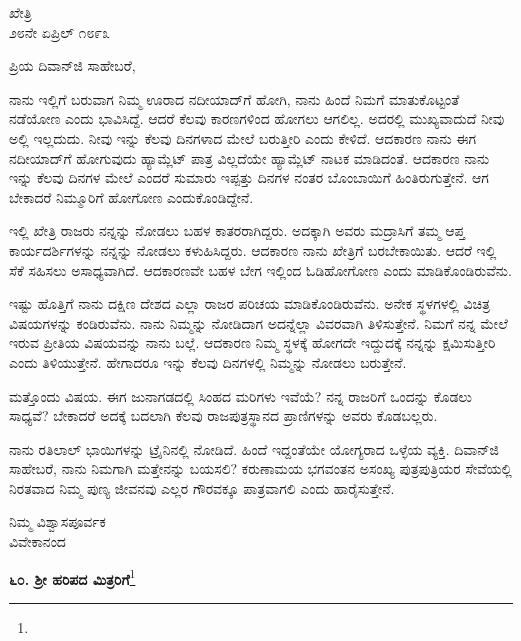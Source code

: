 \vspace{-0.45cm}

\begin{flushright}
ಖೇತ್ರಿ\\೨೮ನೇ ಏಪ್ರಿಲ್ ೧೮೯೩
\end{flushright}

\noindent
ಪ್ರಿಯ ದಿವಾನ್‌ಜಿ ಸಾಹೇಬರೆ,

ನಾನು ಇಲ್ಲಿಗೆ ಬರುವಾಗ ನಿಮ್ಮ ಊರಾದ ನದೀಯಾದ್‌ಗೆ ಹೋಗಿ, ನಾನು ಹಿಂದೆ ನಿಮಗೆ ಮಾತುಕೊಟ್ಟಂತೆ ನಡೆಯೋಣ ಎಂದು ಭಾವಿಸಿದ್ದೆ. ಆದರೆ ಕೆಲವು ಕಾರಣಗಳಿಂದ ಹೋಗಲು ಆಗಲಿಲ್ಲ. ಅದರಲ್ಲಿ ಮುಖ್ಯವಾದುದೆ ನೀವು ಅಲ್ಲಿ ಇಲ್ಲದುದು. ನೀವು ಇನ್ನು ಕೆಲವು ದಿನಗಳಾದ ಮೇಲೆ ಬರುತ್ತೀರಿ ಎಂದು ಕೇಳಿದೆ. ಆದಕಾರಣ ನಾನು ಈಗ ನದೀಯಾದ್‌ಗೆ ಹೋಗುವುದು ಹ್ಯಾಮ್ಲೆಟ್ ಪಾತ್ರ ವಿಲ್ಲದೆಯೇ ಹ್ಯಾಮ್ಲೆಟ್ ನಾಟಕ ಮಾಡಿದಂತೆ. ಆದಕಾರಣ ನಾನು ಇನ್ನು ಕೆಲವು ದಿನಗಳ ಮೇಲೆ ಎಂದರೆ ಸುಮಾರು ಇಪ್ಪತ್ತು ದಿನಗಳ ನಂತರ ಬೊಂಬಾಯಿಗೆ ಹಿಂತಿರುಗುತ್ತೇನೆ. ಆಗ ಬೇಕಾದರೆ ನಿಮ್ಮೂರಿಗೆ ಹೋಗೋಣ ಎಂದುಕೊಂಡಿದ್ದೇನೆ.

ಇಲ್ಲಿ ಖೇತ್ರಿ ರಾಜರು ನನ್ನನ್ನು ನೋಡಲು ಬಹಳ ಕಾತರರಾಗಿದ್ದರು. ಅದಕ್ಕಾಗಿ ಅವರು ಮದ್ರಾಸಿಗೆ ತಮ್ಮ ಆಪ್ತ ಕಾರ್ಯದರ್ಶಿಗಳನ್ನು ನನ್ನನ್ನು ನೋಡಲು ಕಳುಹಿಸಿದ್ದರು. ಆದಕಾರಣ ನಾನು ಖೇತ್ರಿಗೆ ಬರಬೇಕಾಯಿತು. ಆದರೆ ಇಲ್ಲಿ ಸೆಕೆ ಸಹಿಸಲು ಅಸಾಧ್ಯವಾಗಿದೆ. ಆದಕಾರಣವೇ ಬಹಳ ಬೇಗ ಇಲ್ಲಿಂದ ಓಡಿಹೋಗೋಣ ಎಂದು ಮಾಡಿಕೊಂಡಿರುವೆನು.

ಇಷ್ಟು ಹೊತ್ತಿಗೆ ನಾನು ದಕ್ಷಿಣ ದೇಶದ ಎಲ್ಲಾ ರಾಜರ ಪರಿಚಯ ಮಾಡಿಕೊಂಡಿರುವೆನು. ಅನೇಕ ಸ್ಥಳಗಳಲ್ಲಿ ವಿಚಿತ್ರ ವಿಷಯಗಳನ್ನು ಕಂಡಿರುವೆನು. ನಾನು ನಿಮ್ಮನ್ನು ನೋಡಿದಾಗ ಅದನ್ನೆಲ್ಲಾ ವಿವರವಾಗಿ ತಿಳಿಸುತ್ತೇನೆ. ನಿಮಗೆ ನನ್ನ ಮೇಲೆ ಇರುವ ಪ್ರೀತಿಯ ವಿಷಯವನ್ನು ನಾನು ಬಲ್ಲೆ. ಆದಕಾರಣ ನಿಮ್ಮ ಸ್ಥಳಕ್ಕೆ ಹೋಗದೇ ಇದ್ದುದಕ್ಕೆ ನನ್ನನ್ನು ಕ್ಷಮಿಸುತ್ತೀರಿ ಎಂದು ತಿಳಿಯುತ್ತೇನೆ. ಹೇಗಾದರೂ ಇನ್ನು ಕೆಲವು ದಿನಗಳಲ್ಲಿ ನಿಮ್ಮನ್ನು ನೋಡಲು ಬರುತ್ತೇನೆ.

ಮತ್ತೊಂದು ವಿಷಯ. ಈಗ ಜುನಾಗಡದಲ್ಲಿ ಸಿಂಹದ ಮರಿಗಳು ಇವೆಯೆ? ನನ್ನ ರಾಜರಿಗೆ ಒಂದನ್ನು ಕೊಡಲು ಸಾಧ್ಯವೆ? ಬೇಕಾದರೆ ಅದಕ್ಕೆ ಬದಲಾಗಿ ಕೆಲವು ರಾಜಪುತ್ರಸ್ಥಾನದ ಪ್ರಾಣಿಗಳನ್ನು ಅವರು ಕೊಡಬಲ್ಲರು.

ನಾನು ರತಿಲಾಲ್ ಭಾಯಿಗಳನ್ನು ಟ್ರೈನಿನಲ್ಲಿ ನೋಡಿದೆ. ಹಿಂದೆ ಇದ್ದಂತೆಯೇ ಯೋಗ್ಯರಾದ ಒಳ್ಳೆಯ ವ್ಯಕ್ತಿ. ದಿವಾನ್‌ಜಿ ಸಾಹೇಬರೆ, ನಾನು ನಿಮಗಾಗಿ ಮತ್ತೇನನ್ನು ಬಯಸಲಿ? ಕರುಣಾಮಯ ಭಗವಂತನ ಅಸಂಖ್ಯ ಪುತ್ರ\enginline{-}ಪುತ್ರಿಯರ ಸೇವೆಯಲ್ಲಿ ನಿರತವಾದ ನಿಮ್ಮ ಪುಣ್ಯ ಜೀವನವು ಎಲ್ಲರ ಗೌರವಕ್ಕೂ ಪಾತ್ರವಾಗಲಿ ಎಂದು ಹಾರೈಸುತ್ತೇನೆ.

\vspace{-0.45cm}

{\flushright
ನಿಮ್ಮ ವಿಶ್ವಾಸಪೂರ್ವಕ\\ವಿವೇಕಾನಂದ\par}

\begin{center}
\textbf{೬೦. ಶ‍್ರೀ ಹರಿಪದ ಮಿತ್ರರಿಗೆ}\footnote{}
\end{center}

\vspace{-0.75cm}

